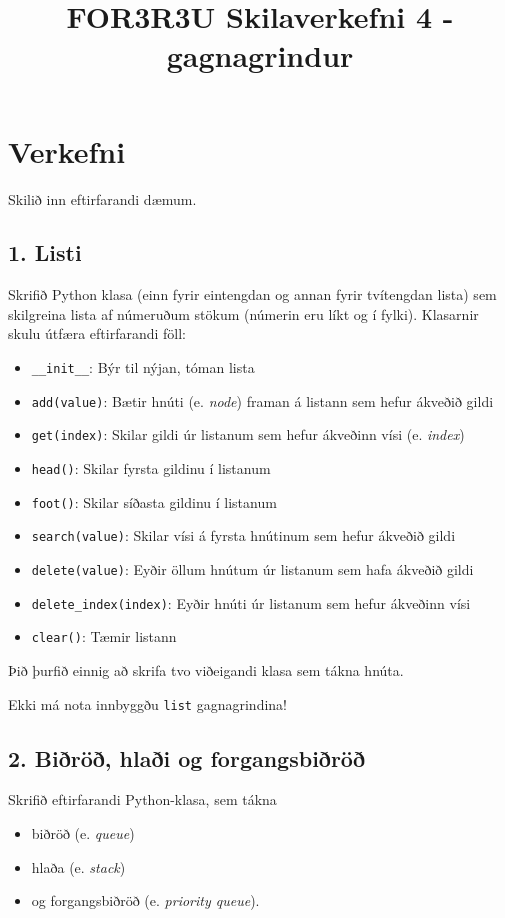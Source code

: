 \documentclass{article}
\title{FOR3R3U Skilaverkefni 4 - gagnagrindur}
\begin{document}
\maketitle
\section{Verkefni}
Skilið inn eftirfarandi dæmum.

\subsection{1. Listi}
Skrifið Python klasa (einn fyrir eintengdan og annan fyrir tvítengdan lista) sem skilgreina lista af númeruðum stökum (númerin eru líkt og í fylki). Klasarnir skulu útfæra eftirfarandi föll:

\begin{itemize}
 \item \verb|__init__|: Býr til nýjan, tóman lista
 \item \texttt{add(value)}: Bætir hnúti (e. \emph{node}) framan á listann sem hefur ákveðið gildi
 \item \texttt{get(index)}: Skilar gildi úr listanum sem hefur ákveðinn vísi (e. \emph{index})
 \item \texttt{head()}: Skilar fyrsta gildinu í listanum
 \item \texttt{foot()}: Skilar síðasta gildinu í listanum
 \item \texttt{search(value)}: Skilar vísi á fyrsta hnútinum sem hefur ákveðið gildi
 \item \texttt{delete(value)}: Eyðir öllum hnútum úr listanum sem hafa ákveðið gildi
 \item \texttt{delete\_index(index)}: Eyðir hnúti úr listanum sem hefur ákveðinn vísi
 \item \texttt{clear()}: Tæmir listann
\end{itemize}
Þið þurfið einnig að skrifa tvo viðeigandi klasa sem tákna hnúta.

Ekki má nota innbyggðu \texttt{list} gagnagrindina!

\subsection{2. Biðröð, hlaði og forgangsbiðröð}
Skrifið eftirfarandi Python-klasa, sem tákna
\begin{itemize}
 \item biðröð (e. \emph{queue})
 \item hlaða (e. \emph{stack})
 \item og forgangsbiðröð (e. \emph{priority queue}).
\end{itemize}
\end{document}
